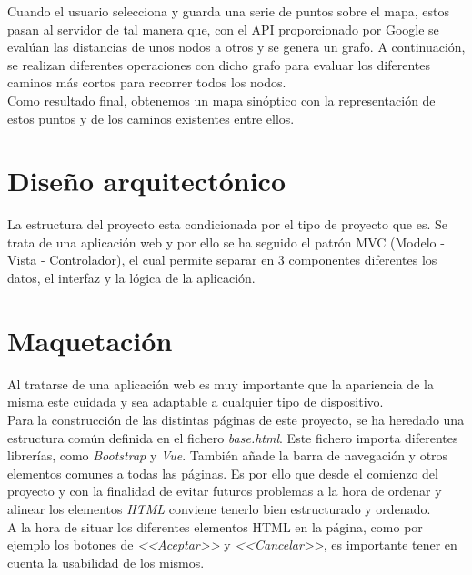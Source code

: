 Cuando el usuario selecciona y guarda una serie de puntos sobre el mapa, estos pasan al servidor de tal manera que, con el API proporcionado por Google se evalúan las distancias de unos nodos a otros y se genera un grafo. A continuación, se realizan diferentes operaciones con dicho grafo para evaluar los diferentes caminos más cortos para recorrer todos los nodos. \\
Como resultado final, obtenemos un mapa sinóptico con la representación de estos puntos y de los caminos existentes entre ellos.


\section{Diseño arquitectónico}

La estructura del proyecto esta condicionada por el tipo de proyecto que es. Se trata de una aplicación web y por ello se ha seguido el patrón MVC (Modelo - Vista - Controlador), el cual permite separar en 3 componentes diferentes los datos, el interfaz y la lógica de la aplicación. 

\section{Maquetación}
Al tratarse de una aplicación web es muy importante que la apariencia de la misma este cuidada y sea adaptable a cualquier tipo de dispositivo.
\\

Para la construcción de las distintas páginas de este proyecto, se ha heredado una estructura común definida en el fichero \textit{base.html}. Este fichero importa diferentes librerías, como \textit{Bootstrap} y \textit{Vue}. También añade la barra de navegación y otros elementos comunes a todas las páginas. Es por ello que desde el comienzo del proyecto y con la finalidad de evitar futuros problemas a la hora de ordenar y alinear los elementos \textit{HTML} conviene tenerlo bien estructurado y ordenado. 
\\
A la hora de situar los diferentes elementos HTML en la página, como por ejemplo los botones de \textit{<<Aceptar>>} y \textit{<<Cancelar>>}, es importante tener en cuenta la usabilidad de los mismos.

